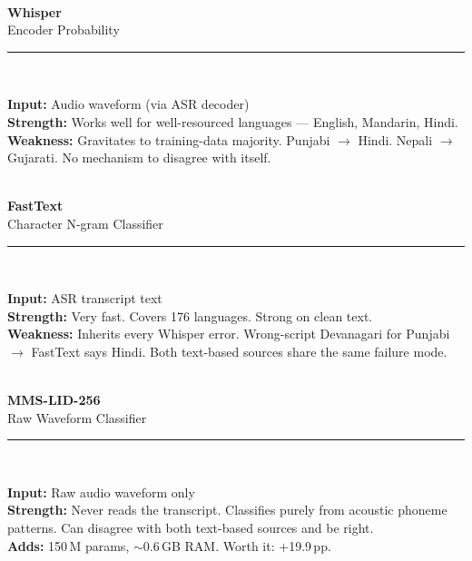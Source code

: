 \documentclass[11pt,a4paper]{article}
\begin{document}
\noindent
\begin{minipage}[t]{0.32\textwidth}
\begin{tcolorbox}[enhanced,colback=SkyBg,colframe=Royal,arc=6pt,boxrule=2pt,
  left=7pt,right=7pt,top=7pt,bottom=7pt,shadow={2pt}{-2pt}{0pt}{black!12}]
\\[3pt]
{\large\color{Navy}\textbf{Whisper}}\\
{\small\color{DGray}Encoder Probability}\\[5pt]
\rule{\linewidth}{0.4pt}\\[4pt]
\small\raggedright
\textbf{Input:} Audio waveform (via ASR decoder)\\[3pt]
\textbf{Strength:} Works well for well-resourced languages --- English, Mandarin, Hindi.\\[3pt]
\textbf{Weakness:} Gravitates to training-data majority. Punjabi $\to$ Hindi. Nepali $\to$ Gujarati. No mechanism to disagree with itself.
\end{tcolorbox}
\end{minipage}\hfill
\begin{minipage}[t]{0.32\textwidth}
\begin{tcolorbox}[enhanced,colback=LTeal,colframe=Teal,arc=6pt,boxrule=2pt,
  left=7pt,right=7pt,top=7pt,bottom=7pt,shadow={2pt}{-2pt}{0pt}{black!12}]
\\[3pt]
{\large\color{Teal}\textbf{FastText}}\\
{\small\color{DGray}Character N-gram Classifier}\\[5pt]
\rule{\linewidth}{0.4pt}\\[4pt]
\small\raggedright
\textbf{Input:} ASR transcript text\\[3pt]
\textbf{Strength:} Very fast. Covers 176 languages. Strong on clean text.\\[3pt]
\textbf{Weakness:} Inherits every Whisper error. Wrong-script Devanagari for Punjabi $\to$ FastText says Hindi. Both text-based sources share the same failure mode.
\end{tcolorbox}
\end{minipage}\hfill
\begin{minipage}[t]{0.32\textwidth}
\begin{tcolorbox}[enhanced,colback=LOrange,colframe=DOrange,arc=6pt,boxrule=2pt,
  left=7pt,right=7pt,top=7pt,bottom=7pt,shadow={2pt}{-2pt}{0pt}{black!12}]
\\[3pt]
{\large\color{DOrange}\textbf{MMS-LID-256}}\\
{\small\color{DGray}Raw Waveform Classifier}\\[5pt]
\rule{\linewidth}{0.4pt}\\[4pt]
\small\raggedright
\textbf{Input:} Raw audio waveform only\\[3pt]
\textbf{Strength:} Never reads the transcript. Classifies purely from acoustic phoneme patterns. Can disagree with both text-based sources and be right.\\[3pt]
\textbf{Adds:} 150\,M params, $\sim$0.6\,GB RAM. Worth it: +19.9\,pp.
\end{tcolorbox}
\end{minipage}
\end{document}
